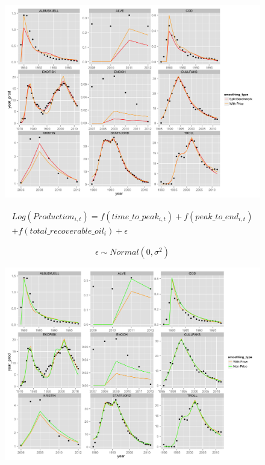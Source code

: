 \documentclass{beamer}
\begin{document}
\begin{frame}[plain]
	\begin{figure}
	\includegraphics[width=1\textwidth]{bench_vs_price.png}
	\end{figure}
\end{frame}

\begin{frame}[plain]
		\begin{multline}
	\nonumber Log(Production_{i,t})=f(time\_to\_peak_{i,t}) + f(peak\_to\_end_{i,t}) \\
	+ f(total\_recoverable\_oil_i) +  \epsilon
	\end{multline}

		\begin{equation}
		\nonumber \epsilon \sim Normal(0, \sigma^2)
		\end{equation}
\end{frame}
\begin{frame}[plain]
	\begin{figure}
	\includegraphics[width=1\textwidth]{price_vs_non_price.png}
	\end{figure}
\end{frame}
\end{document}

